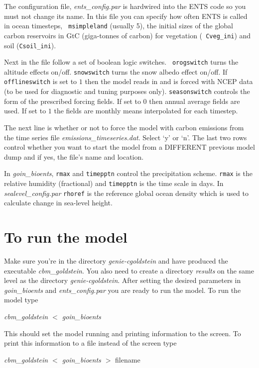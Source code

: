 \documentclass[10pt,a4paper]{report}
\begin{document}
The configuration file, {\em ents\_config.par} is hardwired into the
ENTS code so you must not change its name. In this file you can
specify how often ENTS is called in ocean timesteps, {\tt
msimpleland} (usually 5), the initial sizes of the global carbon
reservoirs in GtC (giga-tonnes of carbon) for vegetation ({\tt
Cveg\_ini}) and soil ({\tt Csoil\_ini}).

Next in the file follow a set of boolean logic switches. {\tt
orogswitch} turns the altitude effects on/off. {\tt snowswitch}
turns the snow albedo effect on/off. If {\tt offlineswitch} is set
to $1$ then the model reads in and is forced with NCEP data (to be
used for diagnostic and tuning purposes only). {\tt seasonswitch}
controls the form of the prescribed forcing fields. If set to $0$
then annual average fields are used. If set to $1$ the fields are
monthly means interpolated for each timestep.

The next line is whether or not to force the model with carbon
emissions from the time series file {\em emissions\_timeseries.dat}.
Select `y' or `n'. The last two rows control whether you want to
start the model from a DIFFERENT previous model dump and if yes, the
file's name and location.

In {\em goin\_bioents}, {\tt rmax} and {\tt timepptn} control the
precipitation scheme. {\tt rmax} is the relative humidity
(fractional) and {\tt timepptn} is the time scale in days. In {\em
sealevel\_config.par} {\tt rhoref} is the reference global ocean
density which is used to calculate change in sea-level height.

\section{To run the model}

Make sure you're in the directory {\em genie-cgoldstein} and have
produced the executable {\em cbm\_goldstein}. You also need to
create a directory {\em results} on the same level as the directory
{\em genie-cgoldstein}. After setting the desired parameters in {\em
goin\_bioents} and {\em ents\_config.par} you are ready to run the
model. To run the model type

{\em cbm\_goldstein $<$ goin\_bioents}

This should set the model running and printing information to the
screen. To print this information to a file instead of the screen
type

{\em cbm\_goldstein $<$ goin\_bioents $>$} filename
\end{document}
